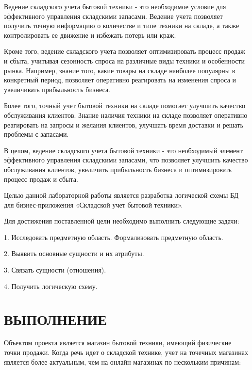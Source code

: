 \documentclass[14pt]{extreport}
\begin{document}
\setlength{\parindent}{1.25cm} %
\pagestyle{empty}


\pagestyle{plain} %

\tableofcontents

\intro\label{intro}

Ведение складского учета бытовой техники - это необходимое условие для эффективного управления складскими запасами. Ведение учета позволяет получить точную информацию о количестве и типе техники на складе, а также контролировать ее движение и избежать потерь или краж.

Кроме того, ведение складского учета позволяет оптимизировать процесс продаж и сбыта, учитывая сезонность спроса на различные виды техники и особенности рынка. Например, знание того, какие товары на складе наиболее популярны в конкретный период, позволяет оперативно реагировать на изменения спроса и увеличивать прибыльность бизнеса.

Более того, точный учет бытовой техники на складе помогает улучшить качество обслуживания клиентов. Знание наличия техники на складе позволяет оперативно реагировать на запросы и желания клиентов, улучшать время доставки и решать проблемы с запасами.

В целом, ведение складского учета бытовой техники - это необходимый элемент эффективного управления складскими запасами, что позволяет улучшить качество обслуживания клиентов, увеличить прибыльность бизнеса и оптимизировать процесс продаж и сбыта.




Целью данной лабораторной работы является разработка логической схемы БД для бизнес-приложения «Складской учет бытовой техники».


Для достижения поставленной цели необходимо выполнить следующие задачи: 

1.	Исследовать предметную область. Формализовать предметную область. 

2.	Выявить основные сущности и их атрибуты. 

3.	Связать сущности (отношения). 

4.	Получить логическую схему.

\chapter{ВЫПОЛНЕНИЕ}
Объектом проекта является магазин бытовой техники, имеющий физические точки продажи. Когда речь идет о складской технике, учет на точечных магазинах является более актуальным, чем на онлайн-магазинах по нескольким причинам:
\end{document}

